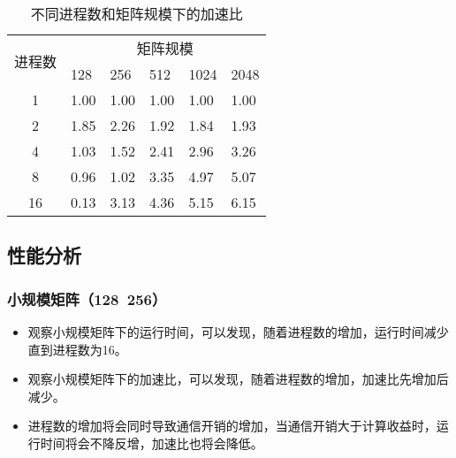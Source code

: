 \documentclass{SYSUReport}
\begin{document}
\begin{table}[H]
\centering
\begin{tabular}{|c|lllll|}
\hline
\multirow{2}{*}{进程数} & \multicolumn{5}{c|}{矩阵规模}                                                                        \\ \cline{2-6} 
 & \multicolumn{1}{l|}{128} & \multicolumn{1}{l|}{256} & \multicolumn{1}{l|}{512} & \multicolumn{1}{l|}{1024} & 2048 \\ \hline
1                    & \multicolumn{1}{l|}{1.00} & \multicolumn{1}{l|}{1.00} & \multicolumn{1}{l|}{1.00} & \multicolumn{1}{l|}{1.00} & 1.00 \\ \hline
2                    & \multicolumn{1}{l|}{1.85} & \multicolumn{1}{l|}{2.26} & \multicolumn{1}{l|}{1.92} & \multicolumn{1}{l|}{1.84} & 1.93 \\ \hline
4                    & \multicolumn{1}{l|}{1.03} & \multicolumn{1}{l|}{1.52} & \multicolumn{1}{l|}{2.41} & \multicolumn{1}{l|}{2.96} & 3.26 \\ \hline
8                    & \multicolumn{1}{l|}{0.96} & \multicolumn{1}{l|}{1.02} & \multicolumn{1}{l|}{3.35} & \multicolumn{1}{l|}{4.97} & 5.07 \\ \hline
16                   & \multicolumn{1}{l|}{0.13} & \multicolumn{1}{l|}{3.13} & \multicolumn{1}{l|}{4.36} & \multicolumn{1}{l|}{5.15} & 6.15 \\ \hline
\end{tabular}
\caption{不同进程数和矩阵规模下的加速比}
\end{table}

\subsection{性能分析}

\subsubsection{小规模矩阵（128~256）}
\begin{itemize}
    \item 观察小规模矩阵下的运行时间，可以发现，随着进程数的增加，运行时间减少直到进程数为16。
    \item 观察小规模矩阵下的加速比，可以发现，随着进程数的增加，加速比先增加后减少。
    \item 进程数的增加将会同时导致通信开销的增加，当通信开销大于计算收益时，运行时间将会不降反增，加速比也将会降低。
\end{itemize}
\end{document}
